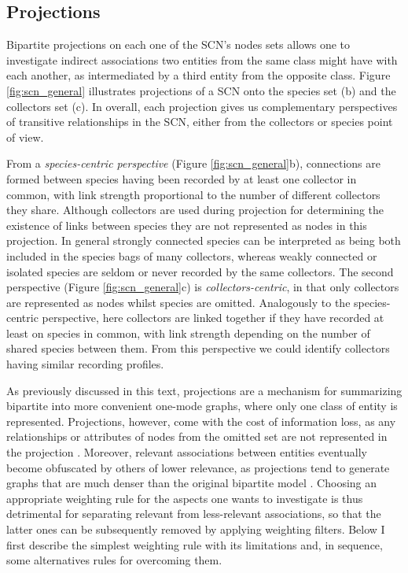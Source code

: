 {%
\subsection{Projections} \label{section:scn_projection}

Bipartite projections on each one of the SCN's nodes sets allows one to investigate indirect associations two entities from the same class might have with each another, as intermediated by a third entity from the opposite class. 
Figure \ref{fig:scn_general} illustrates projections of a SCN onto the species set (b) and the collectors set (c).
In overall, each projection gives us complementary perspectives of transitive relationships in the SCN, either from the collectors or species point of view.

From a \textit{species-centric perspective} (Figure \ref{fig:scn_general}b), connections are formed between species having been recorded by at least one collector in common, with link strength proportional to the number of different collectors they share. 
Although collectors are used during projection for determining the existence of links between species they are not represented as nodes in this projection.
In general strongly connected species can be interpreted as being both included in the species bags of many collectors, whereas weakly connected or isolated species are seldom or never recorded by the same collectors.
The second perspective (Figure \ref{fig:scn_general}c) is \textit{collectors-centric}, in that only collectors are represented as nodes whilst species are omitted. 
Analogously to the species-centric perspective, here collectors are linked together if they have recorded at least on species in common, with link strength depending on the number of shared species between them. 
From this perspective we could identify collectors having similar recording profiles.

As previously discussed in this text, projections are a mechanism for summarizing bipartite into more convenient one-mode graphs, where only one class of entity is represented. 
Projections, however, come with the cost of information loss, as any relationships or attributes of nodes from the omitted set are not represented in the projection \cite{Borgatti1997}. 
Moreover, relevant associations between entities eventually become obfuscated by others of lower relevance, as projections tend to generate graphs that are much denser than the original bipartite model \cite{Lambiotte2005}.
Choosing an appropriate weighting rule for the aspects one wants to investigate is thus detrimental for separating relevant from less-relevant associations, so that the latter ones can be subsequently removed by applying weighting filters.
Below I first describe the simplest weighting rule with its limitations and, in sequence, some alternatives rules for overcoming them.

}
